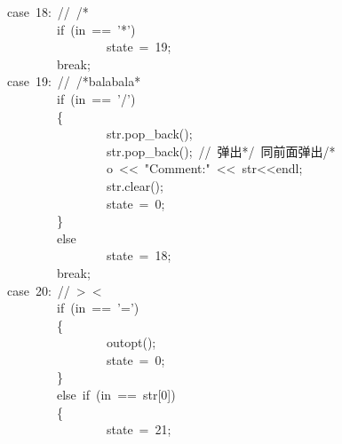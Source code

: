 \documentclass{article}
\begin{document}
\begin{mdpre}
~~~~~~~~~~~~~~~~{case}~{18}:~{//~/*}\\
~~~~~~~~~~~~~~~~~~~~~~~~{if}~(in~==~{'*'})\\
~~~~~~~~~~~~~~~~~~~~~~~~~~~~~~~~state~=~{19};\\
~~~~~~~~~~~~~~~~~~~~~~~~{break};\\
~~~~~~~~~~~~~~~~{case}~{19}:~{//~/*balabala*}\\
~~~~~~~~~~~~~~~~~~~~~~~~{if}~(in~==~{'/'})\\
~~~~~~~~~~~~~~~~~~~~~~~~\{\\
~~~~~~~~~~~~~~~~~~~~~~~~~~~~~~~~str.pop\_back();\\
~~~~~~~~~~~~~~~~~~~~~~~~~~~~~~~~str.pop\_back();~{//~弹出*/~同前面弹出/*}\\
~~~~~~~~~~~~~~~~~~~~~~~~~~~~~~~~o~\textless{}\textless{}~{"}{Comment:}{"}~\textless{}\textless{}~str\textless{}\textless{}endl;\\
~~~~~~~~~~~~~~~~~~~~~~~~~~~~~~~~str.clear();\\
~~~~~~~~~~~~~~~~~~~~~~~~~~~~~~~~state~=~{0};\\
~~~~~~~~~~~~~~~~~~~~~~~~\}\\
~~~~~~~~~~~~~~~~~~~~~~~~{else}\\
~~~~~~~~~~~~~~~~~~~~~~~~~~~~~~~~state~=~{18};\\
~~~~~~~~~~~~~~~~~~~~~~~~{break};\\
~~~~~~~~~~~~~~~~{case}~{20}:~{//~\textgreater{}~\textless{}}\\
~~~~~~~~~~~~~~~~~~~~~~~~{if}~(in~==~{'='})\\
~~~~~~~~~~~~~~~~~~~~~~~~\{\\
~~~~~~~~~~~~~~~~~~~~~~~~~~~~~~~~outopt();\\
~~~~~~~~~~~~~~~~~~~~~~~~~~~~~~~~state~=~{0};\\
~~~~~~~~~~~~~~~~~~~~~~~~\}\\
~~~~~~~~~~~~~~~~~~~~~~~~{else}~{if}~(in~==~str{}[{0}])\\
~~~~~~~~~~~~~~~~~~~~~~~~\{\\
~~~~~~~~~~~~~~~~~~~~~~~~~~~~~~~~state~=~{21};\\

\end{mdpre}
\end{document}
